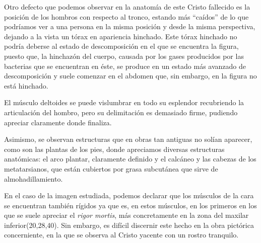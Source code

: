 Otro defecto que podemos observar en la anatomía de este Cristo fallecido es la posición de los hombros con respecto al tronco, estando más ``caídos'' de lo que podríamos ver a una persona en la misma posición y desde la misma perspectiva, dejando a la vista un tórax en apariencia hinchado. Este tórax hinchado no podría deberse al estado de descomposición en el que se encuentra la figura, puesto que, la hinchazón del cuerpo, causada por los gases producidos por las bacterias que se encuentran en éste, se produce en un estado más avanzado de descomposición y suele comenzar en el abdomen que, sin embargo, en la figura no está hinchado.

El músculo deltoides se puede vislumbrar en todo su esplendor recubriendo la articulación del hombro, pero su delimitación es demasiado firme, pudiendo apreciar claramente donde finaliza.

Asimismo, se observan estructuras que en obras tan antiguas no solían aparecer, como son las plantas de los pies, donde apreciamos diversas estructuras anatómicas: el arco plantar, claramente definido y el calcáneo y las cabezas de los metatarsianos, que están cubiertos por grasa subcutánea que sirve de almohadillamiento.

 En el caso de la imagen estudiada, podemos declarar que los músculos de la cara se encuentran también rígidos ya que es, en estos músculos, en los primeros en los que se suele apreciar el \textit{rigor mortis}, más concretamente en la zona del maxilar inferior(20,28,40). Sin embargo, es difícil discernir este hecho en la obra pictórica concerniente, en la que se observa al Cristo yacente con un rostro tranquilo.
